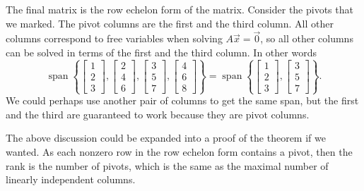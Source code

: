 The final matrix is the row echelon form of the matrix.
Consider the pivots that we marked.
The pivot columns are the first and the third
column.  All other columns correspond to free variables when solving
$A \vec{x} = \vec{0}$, so all other columns can be solved in terms of the first and
the third column.  In other words
\begin{equation*}
\operatorname{span}
\left\{
\begin{bmatrix}
1 \\
2 \\
3 
\end{bmatrix}
,
\begin{bmatrix}
2 \\
4 \\
6
\end{bmatrix}
,
\begin{bmatrix}
3 \\
5 \\
7
\end{bmatrix}
,
\begin{bmatrix}
4 \\
6 \\
8
\end{bmatrix}
\right\}
=
\operatorname{span}
\left\{
\begin{bmatrix}
1 \\
2 \\
3
\end{bmatrix}
,
\begin{bmatrix}
3 \\
5 \\
7
\end{bmatrix}
\right\} .
\end{equation*}
We could perhaps use another pair of columns to get the same span, but the
first and the third are guaranteed to work because they are pivot columns.

The above discussion could be expanded into a proof of the theorem if
we wanted.
As each nonzero row
in the row echelon form contains a pivot, then the rank is the number of
pivots, which is the same as the maximal number of linearly independent
columns.

\medskip

